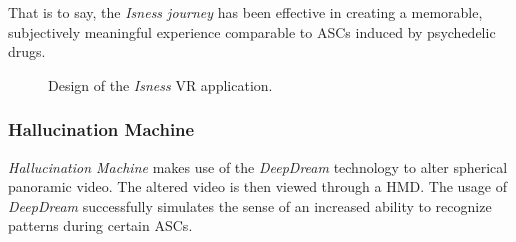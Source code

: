 That is to say, the \textit{Isness journey} has been effective in creating a memorable, subjectively meaningful experience comparable to \acp{ASC} induced by psychedelic drugs.

\begin{figure}%
    \centering
    \quad
    \caption{Design of the \textit{Isness} \ac{VR} application.}%
    \label{fig:glowacki2020isness}%
\end{figure}

\subsubsection{Hallucination Machine}\label{sec:hallucination_machine}
\textit{Hallucination Machine} \autocite{suzuki2018hallucination} makes use of the \textit{DeepDream} \autocite{mordvintsev2015inceptionism} technology to alter spherical panoramic video. The altered video is then viewed through a \ac{HMD}. The usage of \textit{DeepDream} successfully simulates the sense of an increased ability to recognize patterns during certain \acp{ASC}.

